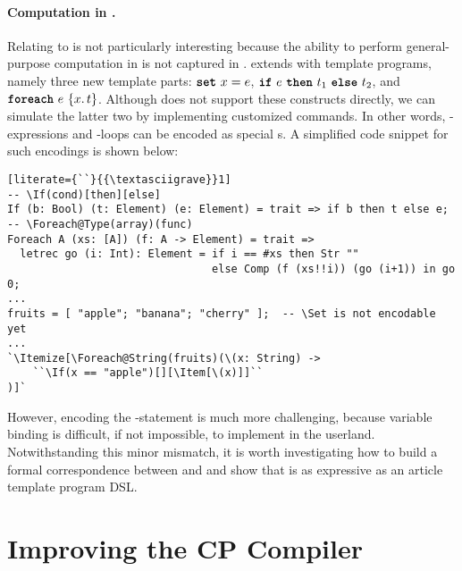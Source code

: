 \paragraph{Computation in \ExT.}
Relating \ExT to \DArtTLit is not particularly interesting because the ability
to perform general-purpose computation in \ExT is not captured in \DArtTLit.
\DArtTProg extends \DArtTLit with template programs, namely three new template
parts: $\text{\ttfamily\bfseries set}\ x = e$, $\text{\ttfamily\bfseries if}\ e\ \text{\ttfamily\bfseries then}\ t_1\ \text{\ttfamily\bfseries else}\ t_2$, and
$\text{\ttfamily\bfseries foreach}\ e\ \{x.\,t\}$. Although \ExT does not support these constructs
directly, we can simulate the latter two by implementing customized commands. In
other words, -expressions and -loops can be encoded as
special s. A simplified code snippet for such encodings is shown below:
\begin{lstlisting}[literate={``}{{\textasciigrave}}1]
-- \If(cond)[then][else]
If (b: Bool) (t: Element) (e: Element) = trait => if b then t else e;
-- \Foreach@Type(array)(func)
Foreach A (xs: [A]) (f: A -> Element) = trait =>
  letrec go (i: Int): Element = if i == #xs then Str ""
                                else Comp (f (xs!!i)) (go (i+1)) in go 0;
...
fruits = [ "apple"; "banana"; "cherry" ];  -- \Set is not encodable yet
...
`\Itemize[\Foreach@String(fruits)(\(x: String) ->
    ``\If(x == "apple")[][\Item[\(x)]]``
)]`
\end{lstlisting}
However, encoding the -statement is much more challenging, because
variable binding is difficult, if not impossible, to implement in the userland.
Notwithstanding this minor mismatch, it is worth investigating how to build a
formal correspondence between \ExT and \DArtTProg and show that \ExT is as
expressive as an article template program DSL.

\section{Improving the CP Compiler}

